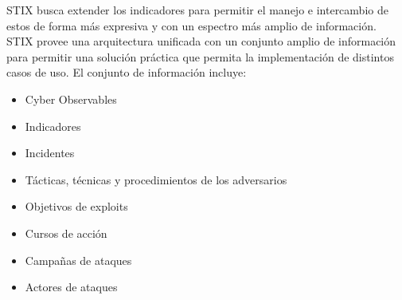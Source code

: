 STIX busca extender los indicadores para permitir el manejo e intercambio de 
estos de forma más expresiva y con un espectro más amplio de información.\\

STIX provee una arquitectura unificada con un conjunto amplio de información 
para permitir una solución práctica que permita la implementación de distintos 
casos de uso. El conjunto de información incluye:
\begin{itemize}
  \item Cyber Observables
  \item Indicadores
  \item Incidentes
  \item Tácticas, técnicas y procedimientos de los adversarios
  \item Objetivos de exploits
  \item Cursos de acción
  \item Campañas de ataques
  \item Actores de ataques
\end{itemize}


